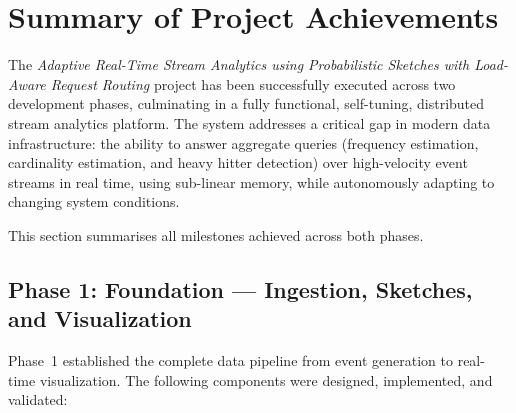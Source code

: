 
\section{Summary of Project Achievements}

The \textit{Adaptive Real-Time Stream Analytics using Probabilistic Sketches with Load-Aware Request Routing} project has been successfully executed across two development phases, culminating in a fully functional, self-tuning, distributed stream analytics platform. The system addresses a critical gap in modern data infrastructure: the ability to answer aggregate queries (frequency estimation, cardinality estimation, and heavy hitter detection) over high-velocity event streams in real time, using sub-linear memory, while autonomously adapting to changing system conditions.

This section summarises all milestones achieved across both phases.

\subsection{Phase 1: Foundation — Ingestion, Sketches, and Visualization}

Phase~1 established the complete data pipeline from event generation to real-time visualization. The following components were designed, implemented, and validated:

